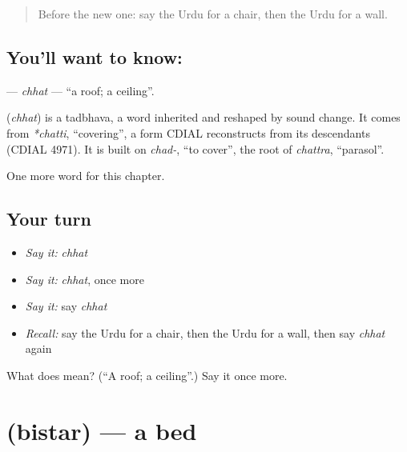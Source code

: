 \label{lesson:UR-C58-chhat}



\begin{quote}
Before the new one: say the Urdu for a chair, then the Urdu for a wall.
\end{quote}

\subsection*{You'll want to know: }
\textbf{} — \emph{chhat} — \textquotedblleft{}a roof; a ceiling\textquotedblright{}.

\begin{cousinweb}
\textbf{} (\emph{chhat}) is a tadbhava, a word inherited and reshaped by sound change. It comes from \emph{*chatti}, \textquotedblleft{}covering\textquotedblright{}, a form CDIAL reconstructs from its descendants (CDIAL 4971). It is built on \emph{chad-}, \textquotedblleft{}to cover\textquotedblright{}, the root of \emph{chattra}, \textquotedblleft{}parasol\textquotedblright{}.
\end{cousinweb}

\begin{grammarlens}[title={What you've built}]
One more word for this chapter.
\end{grammarlens}

\subsection*{Your turn}
\begin{itemize}
\raggedright
  \item \emph{Say it:} \emph{chhat}
  \item \emph{Say it:} \emph{chhat}, once more
  \item \emph{Say it:} say \emph{chhat}
  \item \emph{Recall:} say the Urdu for a chair, then the Urdu for a wall, then say \emph{chhat} again
\end{itemize}

\begin{tcolorbox}[breakable,colback=teal!4,colframe=teal!35!black,title={Before you move on}]
What does  mean? (\textquotedblleft{}A roof; a ceiling\textquotedblright{}.) Say it once more.
\end{tcolorbox}
\section[\texorpdfstring{\ur{بستر} (bistar)}{بستر (bistar)}]{ (bistar) — a bed}

